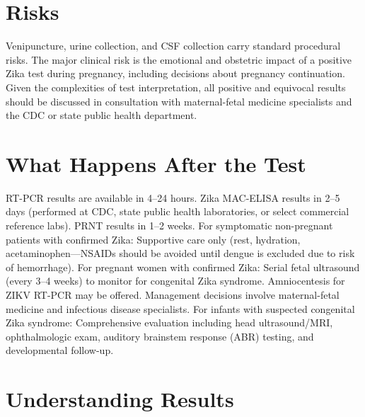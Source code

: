 \section*{Risks}
Venipuncture, urine collection, and CSF collection carry standard procedural risks. The major clinical risk is the emotional and obstetric impact of a positive Zika test during pregnancy, including decisions about pregnancy continuation. Given the complexities of test interpretation, all positive and equivocal results should be discussed in consultation with maternal-fetal medicine specialists and the CDC or state public health department.

\section*{What Happens After the Test}
RT-PCR results are available in 4--24 hours. Zika MAC-ELISA results in 2--5 days (performed at CDC, state public health laboratories, or select commercial reference labs). PRNT results in 1--2 weeks. For symptomatic non-pregnant patients with confirmed Zika: Supportive care only (rest, hydration, acetaminophen---NSAIDs should be avoided until dengue is excluded due to risk of hemorrhage). For pregnant women with confirmed Zika: Serial fetal ultrasound (every 3--4 weeks) to monitor for congenital Zika syndrome. Amniocentesis for ZIKV RT-PCR may be offered. Management decisions involve maternal-fetal medicine and infectious disease specialists. For infants with suspected congenital Zika syndrome: Comprehensive evaluation including head ultrasound/MRI, ophthalmologic exam, auditory brainstem response (ABR) testing, and developmental follow-up.

\section*{Understanding Results}

